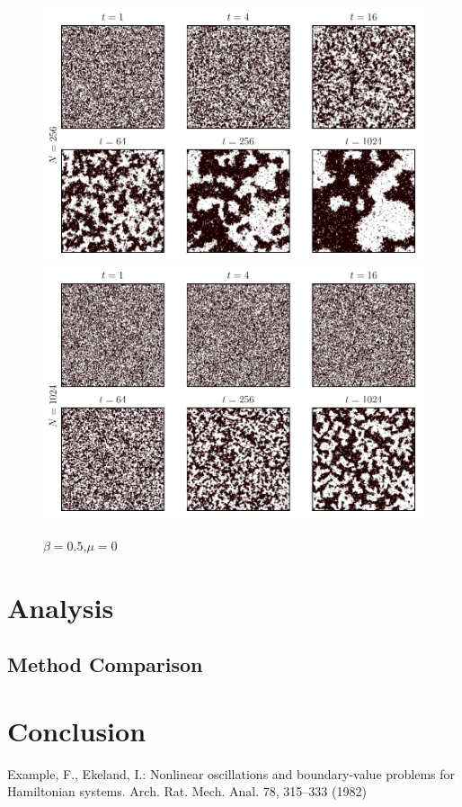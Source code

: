 \documentclass{llncs}
\begin{document}
\begin{figure}
\includegraphics[scale=0.25]{images/image256_0_0.pdf}
\includegraphics[scale=0.25]{images/image1024_0_0.pdf}
\caption{$\beta=0.5$,$\mu=0$}
\end{figure}
\section{Analysis}
\subsection{Method Comparison}

\section{Conclusion}

%
%
\begin{thebibliography}{5}
%
Example, F., Ekeland, I.:
Nonlinear oscillations and
boundary-value problems for Hamiltonian systems.
Arch. Rat. Mech. Anal. 78, 315--333 (1982)


\end{thebibliography}
\end{document}

